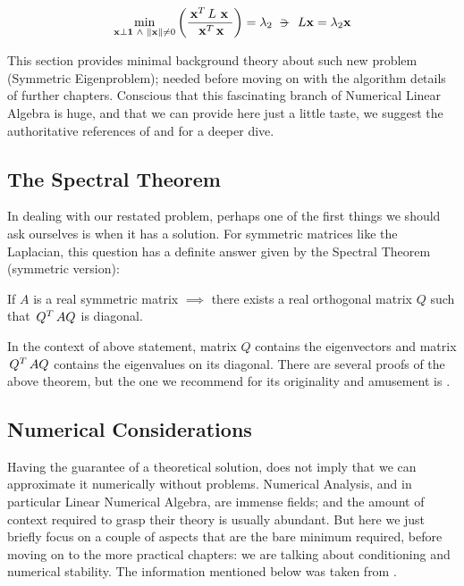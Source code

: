 \begin{equation*}
\min\limits_{\vec{x} \bot \vec{1} \ds{\land} \norm{\vec{x}} \ne 0}
\left(  
\dfrac{\trans{\vec{x}} L \ds{\vec{x}}}{\trans{\vec{x}} \vec{x}}
\right)
= \lambda_2
\suchthat{L\vec{x} = \lambda_2\vec{x}}  
\end{equation*}
\joinbelow{1cm}

This section provides minimal background theory about such new problem
(Symmetric Eigenproblem); needed before moving on with the algorithm
details of further chapters. Conscious that this fascinating branch of
Numerical Linear Algebra is huge, and that we can provide here just a
little taste, we suggest the authoritative references of
\cite{parlett80} and \cite{saad92} for a deeper dive. 

\subsection{The Spectral Theorem}

In dealing with our restated problem, perhaps one of the first things
we should ask ourselves is when it has a solution. For symmetric
matrices like the \gls{Laplacian}, this question has a definite answer given
by the Spectral Theorem (symmetric version):

\begin{theorem*}
If $A$ is a real symmetric matrix $\implies$ there exists a real orthogonal matrix $Q$ such that $\,{Q}^{T}\,AQ$ is diagonal. 
\end{theorem*}
\joinbelow{1cm}

In the context of above statement, matrix $Q$ contains the
eigenvectors and matrix $\,{Q}^{T}\,AQ$ contains the eigenvalues on its
diagonal. There are several proofs of the above theorem, but the one we
recommend for its originality and amusement is \cite{wilf81}.

\subsection{Numerical Considerations}

Having the guarantee of a theoretical solution, does not imply that we
can approximate it numerically without problems. Numerical Analysis,
and in particular Linear Numerical 
Algebra, are immense fields; and the amount of context required to grasp
their theory is usually abundant. But here we just briefly focus on a couple of
aspects that are the bare minimum required, before moving on to the more
practical chapters: we are talking about conditioning and numerical
stability. The information mentioned below was taken from
\cite{bindel09}. \\ 

